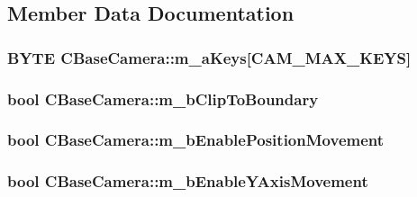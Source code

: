 \subsection{Member Data Documentation}
\hypertarget{class_c_base_camera_aab24266faedbce6a95ca36c23726064c}{
\subsubsection[{m\_\-aKeys}]{\setlength{\rightskip}{0pt plus 5cm}BYTE {\bf CBaseCamera::m\_\-aKeys}\mbox{[}CAM\_\-MAX\_\-KEYS\mbox{]}}}
\label{class_c_base_camera_aab24266faedbce6a95ca36c23726064c}
\hypertarget{class_c_base_camera_a1087c9e2eaf936be735df38f6f8719ad}{
\subsubsection[{m\_\-bClipToBoundary}]{\setlength{\rightskip}{0pt plus 5cm}bool {\bf CBaseCamera::m\_\-bClipToBoundary}}}
\label{class_c_base_camera_a1087c9e2eaf936be735df38f6f8719ad}
\hypertarget{class_c_base_camera_a59fae15ac67cb211049b17bf38672ac8}{
\subsubsection[{m\_\-bEnablePositionMovement}]{\setlength{\rightskip}{0pt plus 5cm}bool {\bf CBaseCamera::m\_\-bEnablePositionMovement}}}
\label{class_c_base_camera_a59fae15ac67cb211049b17bf38672ac8}
\hypertarget{class_c_base_camera_a2fbcc041572a057cfd03c27f157eaf08}{
\subsubsection[{m\_\-bEnableYAxisMovement}]{\setlength{\rightskip}{0pt plus 5cm}bool {\bf CBaseCamera::m\_\-bEnableYAxisMovement}}}
